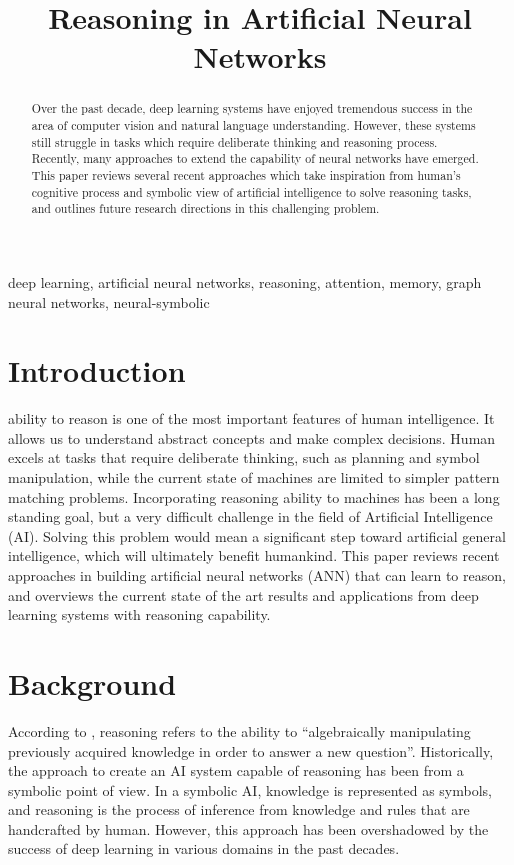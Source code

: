 \documentclass[journal]{IEEEtran}
\begin{document}
\title{Reasoning in Artificial Neural Networks}

\author{
}

\maketitle

\begin{abstract}
Over the past decade, deep learning systems have enjoyed tremendous success in the area of computer vision and natural language understanding.
However, these systems still struggle in tasks which require deliberate thinking and reasoning process. 
Recently, many approaches to extend the capability of neural networks have emerged. 
This paper reviews several recent approaches which take inspiration from human's cognitive process and symbolic view of artificial intelligence
to solve reasoning tasks, and outlines future research directions in this challenging problem.
\end{abstract}

\begin{IEEEkeywords}
deep learning, artificial neural networks, reasoning, attention, memory, graph neural networks, neural-symbolic
\end{IEEEkeywords}

\section{Introduction}

 ability to reason is one of the most important features of human intelligence. 
It allows us to understand abstract concepts and make complex decisions.
Human excels at tasks that require deliberate thinking, such as planning and symbol manipulation, 
while the current state of machines are limited to simpler pattern matching problems.
Incorporating reasoning ability to machines has been a long standing goal, but a very difficult challenge in the field of Artificial Intelligence (AI). 
Solving this problem would mean a significant step toward artificial general intelligence, which will ultimately benefit humankind. 
This paper reviews recent approaches in building artificial neural networks (ANN) that can learn to reason, 
and overviews the current state of the art results and applications from deep learning systems with reasoning capability.

\section{Background}
According to \cite{bottou2014machine}, reasoning refers to the ability to ``algebraically manipulating previously acquired knowledge in order to answer a new question''.
Historically, the approach to create an AI system capable of reasoning has been from a symbolic point of view.
In a symbolic AI, knowledge is represented as symbols, and reasoning is the process of inference from knowledge and rules that are handcrafted by human.
However, this approach has been overshadowed by the success of deep learning in various domains in the past decades. 
\end{document}
